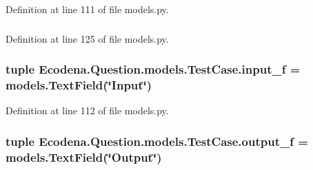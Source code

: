 Definition at line 111 of file models.py.

\hypertarget{class_ecodena_1_1_question_1_1models_1_1_test_case_a80958774ad2d97cb0fabfa415e005000}{
\subsubsection[{caseType\_\-f}]{}}
\label{d4/d96/class_ecodena_1_1_question_1_1models_1_1_test_case_a80958774ad2d97cb0fabfa415e005000}


Definition at line 125 of file models.py.

\hypertarget{class_ecodena_1_1_question_1_1models_1_1_test_case_aeb7c46e67e81b2ca870c79c8968fcdcf}{
\subsubsection[{input\_\-f}]{\setlength{\rightskip}{0pt plus 5cm}tuple {\bf Ecodena.Question.models.TestCase.input\_\-f} = models.TextField(\char`\"{}Input\char`\"{})}}
\label{d4/d96/class_ecodena_1_1_question_1_1models_1_1_test_case_aeb7c46e67e81b2ca870c79c8968fcdcf}


Definition at line 112 of file models.py.

\hypertarget{class_ecodena_1_1_question_1_1models_1_1_test_case_a1bec76507b23217cbf131c113623cad9}{
\subsubsection[{output\_\-f}]{\setlength{\rightskip}{0pt plus 5cm}tuple {\bf Ecodena.Question.models.TestCase.output\_\-f} = models.TextField(\char`\"{}Output\char`\"{})}}
\label{d4/d96/class_ecodena_1_1_question_1_1models_1_1_test_case_a1bec76507b23217cbf131c113623cad9}


